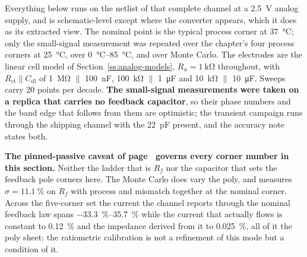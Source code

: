 Everything below runs on the netlist of that complete channel at a
\SI{2.5}{\volt} analog supply, and is schematic-level except where the converter
appears, which it does as its extracted view. The nominal point is the typical
process corner at \SI{37}{\celsius}; only the small-signal measurement was
repeated over the chapter's four process corners at \SI{25}{\celsius}, over
\SIrange{0}{85}{\celsius}, and over Monte Carlo. The electrodes are the linear
cell model of Section~\ref{ss:analog-models}, \(R_u = \SI{1}{\kilo\ohm}\)
throughout, with \(R_{\mathrm{ct}} \parallel C_{\mathrm{dl}}\) of
\SI{1}{\mega\ohm} \(\parallel\) \SI{100}{\nano\farad},
\SI{100}{\kilo\ohm} \(\parallel\) \SI{1}{\micro\farad} and
\SI{10}{\kilo\ohm} \(\parallel\) \SI{10}{\micro\farad}. Sweeps carry \num{20}
points per decade. \textbf{The small-signal measurements were taken on a
replica that carries no feedback capacitor}, so their phase numbers and the
band edge that follows from them are optimistic; the transient campaign runs
through the shipping channel with the \SI{22}{\pico\farad} present, and the
accuracy note states both.

\textbf{The pinned-passive caveat of page~\pageref{p:pinned-passives} governs
every corner number in this section.} Neither the ladder that is \(R_f\) nor the
capacitor that sets the feedback pole corners here. The Monte
Carlo does vary the poly, and measures \(\sigma = \SI{11.1}{\percent}\) on
\(R_f\) with process and mismatch together at the nominal corner. Across the
five-corner set the current the channel reports through the nominal feedback
law spans \SIrange{-33.3}{+35.7}{\percent} while the current that actually
flows is constant to \SI{0.12}{\percent} and the impedance derived from it to
\SI{0.025}{\percent}, all of it the poly sheet: the ratiometric calibration is
not a refinement of this mode but a condition of it.

